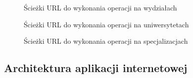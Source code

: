 \begin{figure}[h!]
	\caption{Ścieżki URL do wykonania operacji na wydziałach}
	\centering
\end{figure}

\begin{figure}[h!]
	\caption{Ścieżki URL do wykonania operacji na uniwersytetach}
	\centering
\end{figure}

\begin{figure}[h!]
	\caption{Ścieżki URL do wykonania operacji na specjalizacjach}
	\centering
\end{figure}





\subsection{Architektura aplikacji internetowej}

